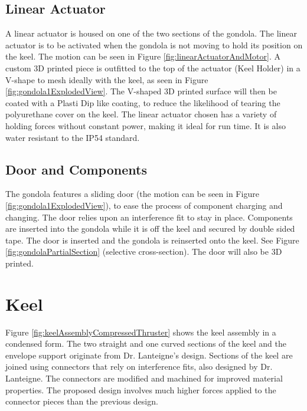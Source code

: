 \documentclass[../main.tex]{subfiles}
\begin{document}
\subsection{Linear Actuator}
A linear actuator is housed on one of the two sections of the gondola. The linear actuator is to be activated when the gondola is not moving to hold its position on the keel. The motion can be seen in Figure \ref{fig:linearActuatorAndMotor}. A custom 3D printed piece is outfitted to the top of the actuator (Keel Holder) in a V-shape to mesh ideally with the keel, as seen in Figure \ref{fig:gondola1ExplodedView}. The V-shaped 3D printed surface will then be coated with a Plasti Dip\textregistered{} like coating, to reduce the likelihood of tearing the polyurethane cover on the keel.  The  linear actuator chosen has a variety of holding forces without constant power, making it ideal for run time. It is also water resistant to the IP54 standard. 
\\
\subsection{Door and Components}
The gondola features a sliding door (the motion can be seen in Figure \ref{fig:gondola1ExplodedView}), to ease the process of component charging and changing. The door relies upon an interference fit to stay in place. Components are inserted into the gondola while it is off the keel and secured by double sided tape. The door is inserted and the gondola is reinserted onto the keel. See Figure \ref{fig:gondolaPartialSection} (selective cross-section). The door will also be 3D printed.
\\
\section{Keel}
Figure \ref{fig:keelAssemblyCompressedThruster} shows the keel assembly in a condensed form. The two straight and one curved sections of the keel and the envelope support originate from Dr. Lanteigne's design. Sections of the keel are joined using connectors that rely on interference fits, also designed by Dr. Lanteigne. The connectors are modified and machined for improved material properties. The proposed design involves much higher forces applied to the connector pieces than the previous design. 
\end{document}

